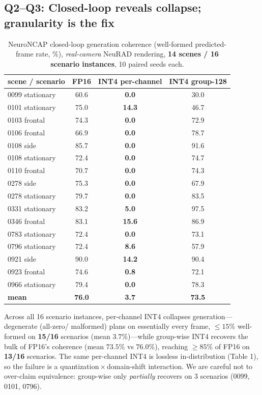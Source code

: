 \documentclass[11pt]{article}
\begin{document}
\subsection{Q2--Q3: Closed-loop reveals collapse; granularity is the fix}
\begin{table}[h]\centering
\caption{NeuroNCAP closed-loop generation coherence (well-formed predicted-frame rate, \%),
\emph{real-camera} NeuRAD rendering, \textbf{14 scenes / 16 scenario instances}, 10 paired seeds each.}
\begin{tabular}{lccc}
\toprule
scene / scenario & FP16 & INT4 per-channel & INT4 group-128 \\
\midrule
0099 stationary & 60.6 & \textbf{0.0} & 30.0 \\
0101 stationary & 75.0 & \textbf{14.3} & 46.7 \\
0103 frontal & 74.3 & \textbf{0.0} & 72.9 \\
0106 frontal & 66.9 & \textbf{0.0} & 78.7 \\
0108 side & 85.7 & \textbf{0.0} & 91.6 \\
0108 stationary & 72.4 & \textbf{0.0} & 74.7 \\
0110 frontal & 70.7 & \textbf{0.0} & 74.3 \\
0278 side & 75.3 & \textbf{0.0} & 67.9 \\
0278 stationary & 79.7 & \textbf{0.0} & 83.5 \\
0331 stationary & 83.2 & \textbf{5.0} & 97.5 \\
0346 frontal & 83.1 & \textbf{15.6} & 86.9 \\
0783 stationary & 72.4 & \textbf{0.0} & 73.1 \\
0796 stationary & 72.4 & \textbf{8.6} & 57.9 \\
0921 side & 90.0 & \textbf{14.2} & 90.4 \\
0923 frontal & 74.6 & \textbf{0.8} & 72.1 \\
0966 stationary & 79.4 & \textbf{0.0} & 78.3 \\
\midrule
\textbf{mean} & \textbf{76.0} & \textbf{3.7} & \textbf{73.5} \\
\bottomrule
\end{tabular}
\end{table}
Across all 16 scenario instances, per-channel INT4 collapses generation---degenerate (all-zero/
malformed) plans on essentially every frame, $\le 15\%$ well-formed on \textbf{15/16} scenarios
(mean $3.7\%$)---while group-wise INT4 recovers the bulk of FP16's coherence (mean $73.5\%$ vs
$76.0\%$), reaching $\ge 85\%$ of FP16 on \textbf{13/16} scenarios. The same per-channel INT4 is
lossless in-distribution (Table 1), so the failure is a quantization\,$\times$\,domain-shift
interaction. We are careful not to over-claim equivalence: group-wise only \emph{partially} recovers
on 3 scenarios (0099, 0101, 0796).
\end{document}
